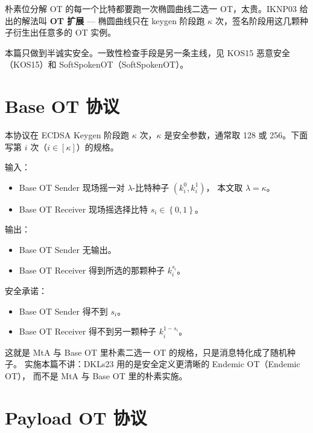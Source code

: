 

朴素位分解 OT 的每一个比特都要跑一次椭圆曲线二选一 OT，太贵。IKNP03
给出的解法叫 \textbf{OT 扩展} --- 椭圆曲线只在 keygen
阶段跑 $\kappa$ 次，签名阶段用这几颗种子衍生出任意多的 OT 实例。

本篇只做到半诚实安全。一致性检查手段是另一条主线，见 KOS15 恶意安全
（KOS15）和 SoftSpokenOT（SoftSpokenOT）。

\section{Base OT 协议}

本协议在 ECDSA Keygen 阶段跑 $\kappa$ 次，$\kappa$ 是安全参数，通常取
128 或 256。下面写第 $i$ 次（$i\in[\kappa]$）的规格。

输入：

\begin{itemize}

\item
  Base OT Sender
  现场摇一对 $\lambda$-比特种子 $\left(k^0_i, k^1_i\right)$，
  本文取 $\lambda=\kappa$。
\item
  Base OT Receiver 现场摇选择比特 $s_i \in \left\{0,1\right\}$。
\end{itemize}

输出：

\begin{itemize}

\item
  Base OT Sender 无输出。
\item
  Base OT Receiver 得到所选的那颗种子 $k^{s_i}_i$。
\end{itemize}

安全承诺：

\begin{itemize}

\item
  Base OT Sender 得不到 $s_i$。
\item
  Base OT Receiver 得不到另一颗种子 $k^{1-s_i}_i$。
\end{itemize}

这就是 MtA 与 Base OT 里朴素二选一 OT 的规格，只是消息特化成了随机种子。
实施本篇不讲：DKLs23 用的是安全定义更清晰的 Endemic OT（Endemic OT），
而不是 MtA 与 Base OT 里的朴素实施。

\section{Payload OT 协议}

